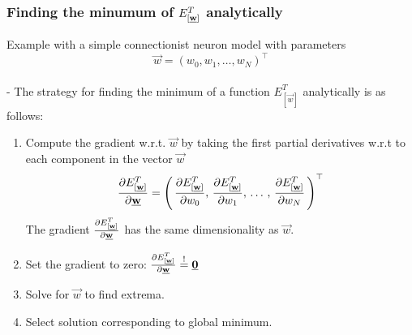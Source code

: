 \begin{frame}\frametitle{Finding the minumum of ${E}^T_{[\underline{\mathbf{w}}]}$ analytically}

    Example with a simple connectionist neuron model
    with parameters
    $$\vec w = (w_{0}, w_{1}, \ldots, w_{N})^{\top}$$\\


    - The strategy for finding the minimum of a function $E_{[\vec{w}]}^T$ analytically is as follows:
    \begin{enumerate}
    \item Compute the gradient w.r.t. $\vec w$ by taking the first partial derivatives w.r.t to each component in the vector $\vec w$
    \begin{equation}
        \frac{\partial {E}^T_{[\underline{\mathbf{w}}]}}{\partial \underline{\mathbf{w}}} = \left(\,
        \frac{\partial {E}^T_{[\underline{\mathbf{w}}]}}{\partial w_{0}}, \,
        \frac{\partial {E}^T_{[\underline{\mathbf{w}}]}}{\partial w_{1}}, \,\ldots\,,\, 
        \frac{\partial {E}^T_{[\underline{\mathbf{w}}]}}{\partial w_{N}}\,
        \right)^{\top}
        \label{eq:gradient_partial}
    \end{equation}
    The gradient $\frac{\partial {E}^T_{[\underline{\mathbf{w}}]}}{\partial \underline{\mathbf{w}}}$ has the same dimensionality as $\vec w$.
    
    \item Set the gradient to zero: $\frac{\partial {E}^T_{[\underline{\mathbf{w}}]}}{\partial \underline{\mathbf{w}}} \stackrel{\mathrm{!}}{=} \underline{\mathbf{0}}$
    \item Solve for $\vec w$ to find extrema.
    \item Select solution corresponding to global minimum.
    
    \end{enumerate}
\end{frame}


